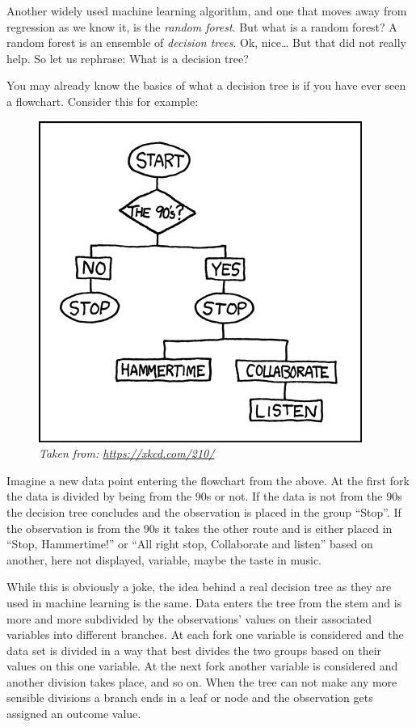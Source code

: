 \documentclass[
]{book}
\begin{document}
Another widely used machine learning algorithm, and one that moves away from
regression as we know it, is the \emph{random forest}.
But what is a random forest? A random forest is an ensemble of
\emph{decision trees}. Ok, nice\ldots{} But that did not really help. So let us
rephrase: What is a decision tree?

You may already know the basics of what a decision tree is if you have ever
seen a flowchart. Consider this for example:

\begin{figure}
\centering
\includegraphics{90s_flowchart.png}
\caption{\emph{Taken from: \url{https://xkcd.com/210/}}}
\end{figure}

Imagine a new data point entering the flowchart from the above. At the first
fork the data is divided by being from the 90s or not. If the data is not from
the 90s the decision tree concludes and the observation is placed in the group
``Stop''. If the observation is from the 90s it takes the other route and is
either placed in ``Stop, Hammertime!'' or ``All right stop, Collaborate and
listen'' based on another, here not displayed, variable, maybe the taste in
music.

While this is obviously a joke, the idea behind a real decision tree as they
are used in machine learning is the same. Data enters the tree from the stem and
is more and more subdivided by the observations' values on their associated
variables into different branches. At each fork one variable is considered and
the data set is divided in a way that best divides the two groups based on their
values on this one variable. At the next fork another variable is considered and
another division takes place, and so on. When the tree can not make any more
sensible divisions a branch ends in a leaf or node and the observation gets
assigned an outcome value.
\end{document}
